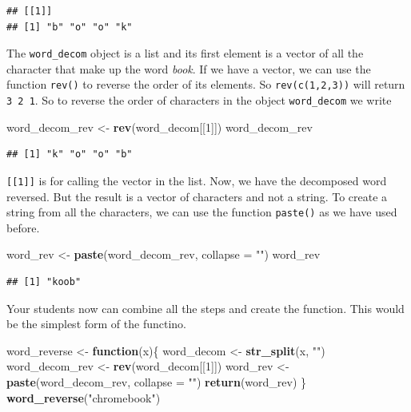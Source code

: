 \documentclass[]{book}
\newenvironment{Shaded}{\begin{snugshade}}{\end{snugshade}}
\newcommand{\ControlFlowTok}[1]{\textcolor[rgb]{0.13,0.29,0.53}{\textbf{#1}}}
\newcommand{\DataTypeTok}[1]{\textcolor[rgb]{0.13,0.29,0.53}{#1}}
\newcommand{\DecValTok}[1]{\textcolor[rgb]{0.00,0.00,0.81}{#1}}
\newcommand{\KeywordTok}[1]{\textcolor[rgb]{0.13,0.29,0.53}{\textbf{#1}}}
\newcommand{\NormalTok}[1]{#1}
\newcommand{\StringTok}[1]{\textcolor[rgb]{0.31,0.60,0.02}{#1}}
\begin{document}
\begin{verbatim}
## [[1]]
## [1] "b" "o" "o" "k"
\end{verbatim}

The \texttt{word\_decom} object is a list and its first element is a vector of all the character that make up the word \emph{book}. If we have a vector, we can use the function \texttt{rev()} to reverse the order of its elements. So \texttt{rev(c(1,2,3))} will return \texttt{3\ 2\ 1}. So to reverse the order of characters in the object \texttt{word\_decom} we write

\begin{Shaded}
\begin{Highlighting}[]
\NormalTok{word_decom_rev <-}\StringTok{ }\KeywordTok{rev}\NormalTok{(word_decom[[}\DecValTok{1}\NormalTok{]])}
\NormalTok{word_decom_rev}
\end{Highlighting}
\end{Shaded}

\begin{verbatim}
## [1] "k" "o" "o" "b"
\end{verbatim}

\texttt{{[}{[}1{]}{]}} is for calling the vector in the list. Now, we have the decomposed word reversed. But the result is a vector of characters and not a string. To create a string from all the characters, we can use the function \texttt{paste()} as we have used before.

\begin{Shaded}
\begin{Highlighting}[]
\NormalTok{word_rev <-}\StringTok{ }\KeywordTok{paste}\NormalTok{(word_decom_rev, }\DataTypeTok{collapse =} \StringTok{""}\NormalTok{)}
\NormalTok{word_rev}
\end{Highlighting}
\end{Shaded}

\begin{verbatim}
## [1] "koob"
\end{verbatim}

Your students now can combine all the steps and create the function. This would be the simplest form of the functino.

\begin{Shaded}
\begin{Highlighting}[]
\NormalTok{word_reverse <-}\StringTok{ }\ControlFlowTok{function}\NormalTok{(x)\{}
\NormalTok{    word_decom <-}\StringTok{ }\KeywordTok{str_split}\NormalTok{(x, }\StringTok{""}\NormalTok{)}
\NormalTok{    word_decom_rev <-}\StringTok{ }\KeywordTok{rev}\NormalTok{(word_decom[[}\DecValTok{1}\NormalTok{]])}
\NormalTok{    word_rev <-}\StringTok{ }\KeywordTok{paste}\NormalTok{(word_decom_rev, }\DataTypeTok{collapse =} \StringTok{""}\NormalTok{)}
    \KeywordTok{return}\NormalTok{(word_rev)}
\NormalTok{\}}
\KeywordTok{word_reverse}\NormalTok{(}\StringTok{"chromebook"}\NormalTok{)}
\end{Highlighting}
\end{Shaded}
\end{document}
